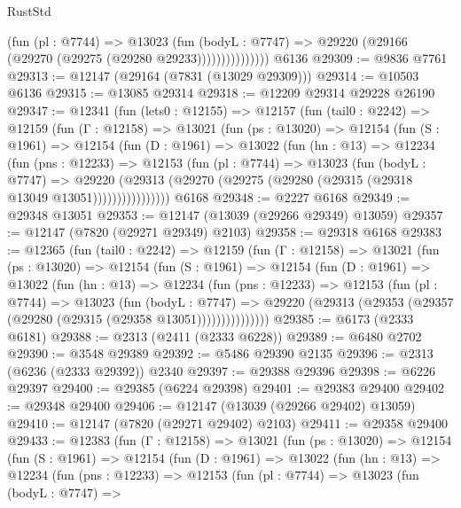 \begin{lexlean}{RustStd}
\begin{coremodule}
                      (fun (pl : @7744) =>
                      @13023
                        (fun (bodyL : @7747) =>
                        @29220 (@29166 (@29270 (@29275 (@29280 @29233)))))))))))))))
    @6136
@29309 := @9836 @7761
@29313 := @12147 (@29164 (@7831 (@13029 @29309)))
@29314 := @10503 @6136
@29315 := @13085 @29314
@29318 := @12209 @29314 @29228 @26190
@29347 := @12341
    (fun (lets0 : @12155) =>
    @12157
      (fun (tail0 : @2242) =>
      @12159
        (fun (Γ : @12158) =>
        @13021
          (fun (ps : @13020) =>
          @12154
            (fun (S : @1961) =>
            @12154
              (fun (D : @1961) =>
              @13022
                (fun (hn : @13) =>
                @12234
                  (fun (pns : @12233) =>
                  @12153
                    (fun (pl : @7744) =>
                    @13023
                      (fun (bodyL : @7747) =>
                      @29220
                        (@29313
                          (@29270 (@29275 (@29280 (@29315 (@29318 @13049 @13051))))))))))))))))
    @6168
@29348 := @2227 @6168
@29349 := @29348 @13051
@29353 := @12147 (@13039 (@29266 @29349) @13059)
@29357 := @12147 (@7820 (@29271 @29349) @2103)
@29358 := @29318 @6168
@29383 := @12365
    (fun (tail0 : @2242) =>
    @12159
      (fun (Γ : @12158) =>
      @13021
        (fun (ps : @13020) =>
        @12154
          (fun (S : @1961) =>
          @12154
            (fun (D : @1961) =>
            @13022
              (fun (hn : @13) =>
              @12234
                (fun (pns : @12233) =>
                @12153
                  (fun (pl : @7744) =>
                  @13023
                    (fun (bodyL : @7747) =>
                    @29220 (@29313 (@29353 (@29357 (@29280 (@29315 (@29358 @13051)))))))))))))))
@29385 := @6173 (@2333 @6181)
@29388 := @2313 (@2411 (@2333 @6228))
@29389 := @6480 @2702
@29390 := @3548 @29389
@29392 := @5486 @29390 @2135
@29396 := @2313 (@6236 (@2333 @29392)) @2340
@29397 := @29388 @29396
@29398 := @6226 @29397
@29400 := @29385 (@6224 @29398)
@29401 := @29383 @29400
@29402 := @29348 @29400
@29406 := @12147 (@13039 (@29266 @29402) @13059)
@29410 := @12147 (@7820 (@29271 @29402) @2103)
@29411 := @29358 @29400
@29433 := @12383
    (fun (Γ : @12158) =>
    @13021
      (fun (ps : @13020) =>
      @12154
        (fun (S : @1961) =>
        @12154
          (fun (D : @1961) =>
          @13022
            (fun (hn : @13) =>
            @12234
              (fun (pns : @12233) =>
              @12153
                (fun (pl : @7744) =>
                @13023
                  (fun (bodyL : @7747) =>

\end{coremodule}
\end{lexlean}
